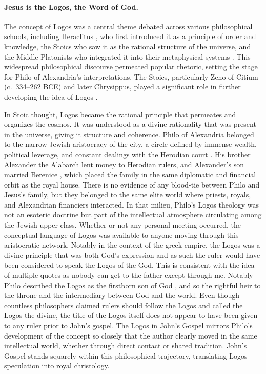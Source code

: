 \paragraph{Jesus is the Logos, the Word of God.}\label{par:jesus-is-the-logos-the-word-of-god.}
The concept of Logos was a central theme debated across various philosophical schools, including Heraclitus \cite[9.9]{hippolytus:refutatio}, who first introduced it as a principle of order and knowledge, the Stoics who saw it as the rational structure of the universe, and the Middle Platonists who integrated it into their metaphysical systems \cite[54--55]{plutarch:deiside}.
This widespread philosophical discourse permeated popular rhetoric, setting the stage for Philo of Alexandria’s interpretations.
The Stoics, particularly Zeno of Citium (c.~334--262 BCE) and later Chrysippus, played a significant role in further developing the idea of Logos \cite[7.134--147]{diogenes:lives}.

In Stoic thought, Logos became the rational principle that permeates and organizes the cosmos.
It was understood as a divine rationality that was present in the universe, giving it structure and coherence.
Philo of Alexandria belonged to the narrow Jewish aristocracy of the city, a circle defined by immense wealth, political leverage, and constant dealings with the Herodian court \cite{philo:legatio}.
His brother Alexander the Alabarch lent money to Herodian rulers, and Alexander's son married Berenice \cite[18.159; 19.276--277]{josephus:ant}, which placed the family in the same diplomatic and financial orbit as the royal house.
There is no evidence of any blood-tie between Philo and Jesus's family, but they belonged to the same elite world where priests, royals, and Alexandrian financiers interacted.
In that milieu, Philo's Logos theology was not an esoteric doctrine but part of the intellectual atmosphere circulating among the Jewish upper class.
Whether or not any personal meeting occurred, the conceptual language of Logos was available to anyone moving through this aristocratic network.
Notably in the context of the greek empire, the Logos was a divine principle that was both God’s expression and as such the ruler would have been considered to speak the Logos of the God.
This is consistent with the idea of multiple quotes as nobody can get to the father except through me.
Notably Philo described the Logos as the firstborn son of God \cite[146]{philo:confusione}, and so the rightful heir to the throne and the intermediary between God and the world.
Even though countless philosophers claimed rulers should follow the Logos and called the Logos the divine, the title of the Logos itself does not appear to have been given to any ruler prior to John’s gospel.
The Logos in John's Gospel mirrors Philo's development of the concept so closely that the author clearly moved in the same intellectual world, whether through direct contact or shared tradition.
John's Gospel stands squarely within this philosophical trajectory, translating Logos-speculation into royal christology.


